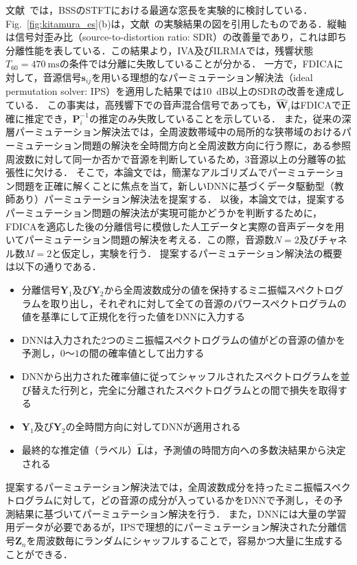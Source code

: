 文献~\cite{EU}では，BSSのSTFTにおける最適な窓長を実験的に検討している．
Fig.~\ref{fig:kitamura_es}(b)は，文献~\cite{EU}の実験結果の図を引用したものである．縦軸は信号対歪み比（source-to-distortion ratio: SDR）\cite{BSSEval}の改善量であり，これは即ち分離性能を表している．この結果より，IVA及びILRMAでは，残響状態$T_{60} = 470~\mathrm{ms}$の条件では分離に失敗していることが分かる．
一方で，FDICAに対して，音源信号$\bm{s}_{ij}$を用いる理想的なパーミュテーション解決法（ideal permutation solver: IPS）を適用した結果では10~dB以上のSDRの改善を達成している．
この事実は，高残響下での音声混合信号であっても，$\hat{\bm{W}}_i$はFDICAで正確に推定でき，$\bm{P}_i^{-1}$の推定のみ失敗していることを示している．
また，従来の深層パーミュテーション解決法では，全周波数帯域中の局所的な狭帯域のおけるパーミュテーション問題の解決を全時間方向と全周波数方向に行う際に，ある参照周波数に対して同一か否かで音源を判断しているため，3音源以上の分離等の拡張性に欠ける．
そこで，本論文では，簡潔なアルゴリズムでパーミュテーション問題を正確に解くことに焦点を当て，新しいDNNに基づくデータ駆動型（教師あり）パーミュテーション解決法を提案する．
以後，本論文では，提案するパーミュテーション問題の解決法が実現可能かどうかを判断するために，FDICAを適応した後の分離信号に模倣した人工データと実際の音声データを用いてパーミュテーション問題の解決を考える．この際，音源数$N=2$及びチャネル数$M=2$と仮定し，実験を行う．
提案するパーミュテーション解決法の概要は以下の通りである．
\begin{itemize}
    \item 分離信号$\bm{Y}_1$及び$\bm{Y}_2$から全周波数成分の値を保持するミニ振幅スペクトログラムを取り出し，それぞれに対して全ての音源のパワースペクトログラムの値を基準にして正規化を行った値をDNNに入力する
    \item DNNは入力された2つのミニ振幅スペクトログラムの値がどの音源の値かを予測し，$0$〜$1$の間の確率値として出力する
    \item DNNから出力された確率値に従ってシャッフルされたスペクトログラムを並び替えた行列と，完全に分離されたスペクトログラムとの間で損失を取得する
    \item $\bm{Y}_1$及び$\bm{Y}_2$の全時間方向に対してDNNが適用される
    \item 最終的な推定値（ラベル）$\widehat{\bm{L}}$は，予測値の時間方向への多数決結果から決定される
\end{itemize}

提案するパーミュテーション解決法では，全周波数成分を持ったミニ振幅スペクトログラムに対して，どの音源の成分が入っているかをDNNで予測し，その予測結果に基づいてパーミュテーション解決を行う．
また，DNNには大量の学習用データが必要であるが，IPSで理想的にパーミュテーション解決された分離信号$\bm{Z}_n$を周波数毎にランダムにシャッフルすることで，容易かつ大量に生成することができる．
